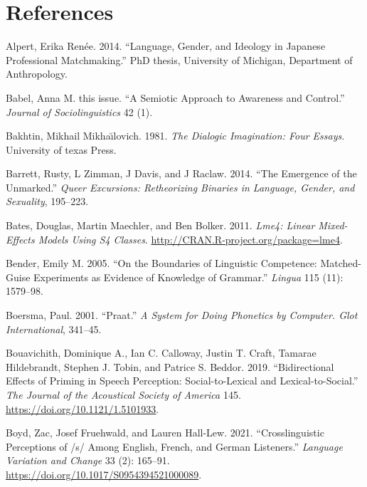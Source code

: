 \documentclass[
  letterpaper,
  DIV=11,
  numbers=noendperiod]{scrartcl}
\newlength{\cslhangindent}
\newenvironment{CSLReferences}[2] %
 {\begin{list}{}{%
  \setlength{\itemindent}{0pt}
  \setlength{\leftmargin}{0pt}
  \setlength{\parsep}{0pt}
  \ifodd #1
   \setlength{\leftmargin}{\cslhangindent}
   \setlength{\itemindent}{-1\cslhangindent}
  \fi
  \setlength{\itemsep}{#2\baselineskip}}}
 {\end{list}}
\begin{document}
\section*{References}\label{sec-references}

\label{refs}
\begin{CSLReferences}{1}{0}
Alpert, Erika Renée. 2014. {``Language, Gender, and Ideology in Japanese
Professional Matchmaking.''} PhD thesis, University of Michigan,
Department of Anthropology.

Babel, Anna M. this issue. {``A Semiotic Approach to Awareness and
Control.''} \emph{Journal of Sociolinguistics} 42 (1).

Bakhtin, Mikhail Mikhaı̆lovich. 1981. \emph{The Dialogic Imagination:
Four Essays}. University of texas Press.

Barrett, Rusty, L Zimman, J Davis, and J Raclaw. 2014. {``The Emergence
of the Unmarked.''} \emph{Queer Excursions: Retheorizing Binaries in
Language, Gender, and Sexuality}, 195--223.

Bates, Douglas, Martin Maechler, and Ben Bolker. 2011. \emph{Lme4:
Linear Mixed-Effects Models Using S4 Classes}.
\url{http://CRAN.R-project.org/package=lme4}.

Bender, Emily M. 2005. {``On the Boundaries of Linguistic Competence:
Matched-Guise Experiments as Evidence of Knowledge of Grammar.''}
\emph{Lingua} 115 (11): 1579--98.

Boersma, Paul. 2001. {``Praat.''} \emph{A System for Doing Phonetics by
Computer. {Glot} {International}}, 341--45.

Bouavichith, Dominique A., Ian C. Calloway, Justin T. Craft, Tamarae
Hildebrandt, Stephen J. Tobin, and Patrice S. Beddor. 2019.
{``Bidirectional Effects of Priming in Speech Perception:
Social-to-Lexical and Lexical-to-Social.''} \emph{The Journal of the
Acoustical Society of America} 145.
\url{https://doi.org/10.1121/1.5101933}.

Boyd, Zac, Josef Fruehwald, and Lauren Hall-Lew. 2021.
{``Crosslinguistic Perceptions of /s/ Among English, French, and German
Listeners.''} \emph{Language Variation and Change} 33 (2): 165--91.
\url{https://doi.org/10.1017/S0954394521000089}.


\end{CSLReferences}
\end{document}
